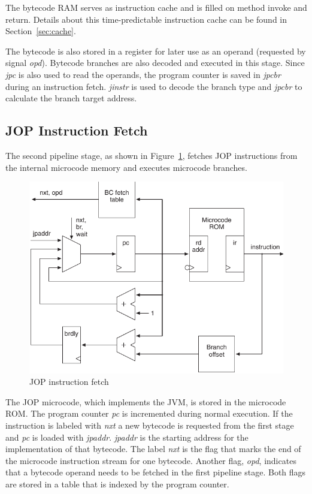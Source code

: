 The bytecode RAM serves as instruction cache and is filled on method
invoke and return. Details about this time-predictable instruction
cache can be found in Section~\ref{sec:cache}.

The bytecode is also stored in a register for later use as an
operand (requested by signal \emph{opd}). Bytecode branches are also
decoded and executed in this stage. Since \emph{jpc} is also used to
read the operands, the program counter is saved in \emph{jpcbr}
during an instruction fetch. \emph{jinstr} is used to decode the
branch type and \emph{jpcbr} to calculate the branch target address.

\subsection{JOP Instruction Fetch}

The second pipeline stage, as shown in Figure~\ref{fig_arch_fetch},
fetches JOP instructions from the internal microcode memory and
executes microcode branches.

\begin{figure}
    \centering
    \includegraphics[scale=\picscale]{arch/arch_fetch}
    \caption{JOP instruction fetch}
    \label{fig_arch_fetch}
\end{figure}

The JOP microcode, which implements the JVM, is stored in the
microcode ROM. The program counter \emph{pc} is incremented during
normal execution. If the instruction is labeled with \emph{nxt} a
new bytecode is requested from the first stage and \emph{pc} is
loaded with \emph{jpaddr}. \emph{jpaddr} is the starting address for
the implementation of that bytecode. The label \emph{nxt} is the
flag that marks the end of the microcode instruction stream for one
bytecode. Another flag, \emph{opd}, indicates that a bytecode
operand needs to be fetched in the first pipeline stage. Both flags
are stored in a table that is indexed by the program counter.

